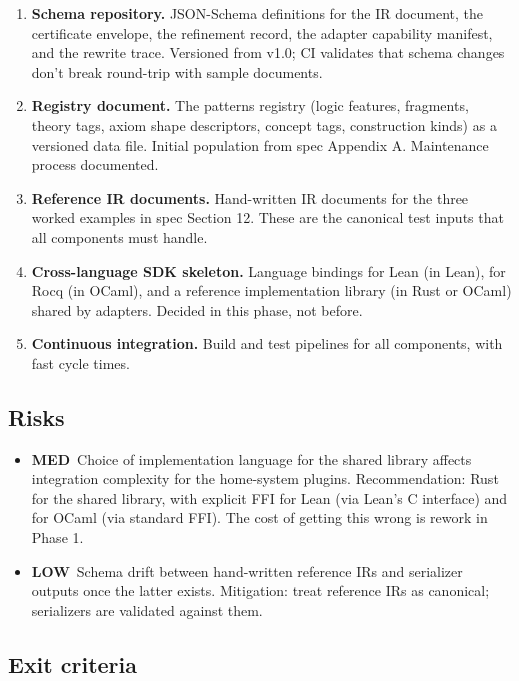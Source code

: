 \documentclass[11pt,letterpaper]{article}
\newcommand{\medrisk}{\textcolor{riskmed}{\textbf{MED}}}
\newcommand{\lowrisk}{\textcolor{risklow}{\textbf{LOW}}}
\begin{document}
\begin{enumerate}
  \item \textbf{Schema repository.} JSON-Schema definitions for the IR
        document, the certificate envelope, the refinement record, the
        adapter capability manifest, and the rewrite trace. Versioned
        from v1.0; CI validates that schema changes don't break
        round-trip with sample documents.
  \item \textbf{Registry document.} The patterns registry (logic
        features, fragments, theory tags, axiom shape descriptors,
        concept tags, construction kinds) as a versioned data file.
        Initial population from spec Appendix A. Maintenance process
        documented.
  \item \textbf{Reference IR documents.} Hand-written IR documents for
        the three worked examples in spec Section 12. These are the
        canonical test inputs that all components must handle.
  \item \textbf{Cross-language SDK skeleton.} Language bindings for
        Lean (in Lean), for Rocq (in OCaml), and a reference
        implementation library (in Rust or OCaml) shared by
        adapters. Decided in this phase, not before.
  \item \textbf{Continuous integration.} Build and test pipelines for
        all components, with fast cycle times.
\end{enumerate}

\subsection{Risks}

\begin{itemize}
  \item \medrisk\ Choice of implementation language for the shared
        library affects integration complexity for the home-system
        plugins. Recommendation: Rust for the shared library, with
        explicit FFI for Lean (via Lean's C interface) and for OCaml
        (via standard FFI). The cost of getting this wrong is rework
        in Phase 1.
  \item \lowrisk\ Schema drift between hand-written reference IRs
        and serializer outputs once the latter exists. Mitigation:
        treat reference IRs as canonical; serializers are validated
        against them.
\end{itemize}

\subsection{Exit criteria}
\end{document}
